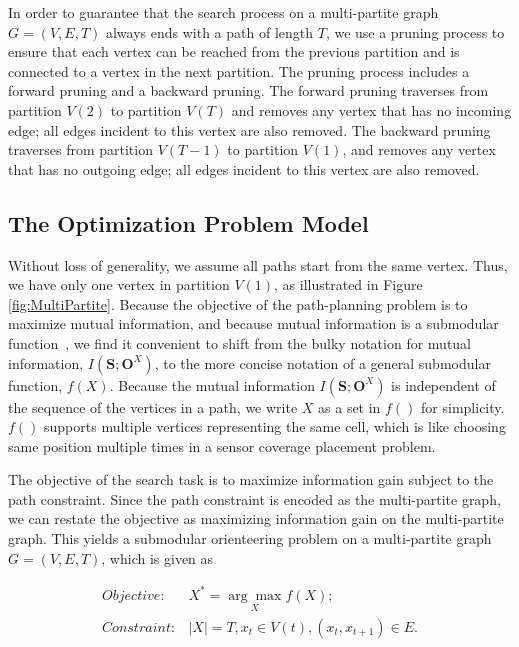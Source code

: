 In order to guarantee that the search process on a multi-partite graph $ G = (V, E, T) $ always ends with a path of length $ T $, we use a pruning process to ensure that each vertex can be reached from the previous partition and is connected to a vertex in the next partition.
The pruning process includes a forward pruning and a backward pruning.
The forward pruning traverses from partition $ V(2) $ to partition $ V(T) $ and removes any vertex that has no incoming edge; all edges incident to this vertex are also removed.
The backward pruning traverses from partition $ V(T-1) $ to partition $ V(1) $, and removes any vertex that has no outgoing edge; all edges incident to this vertex are also removed.

\subsection{The Optimization Problem Model}

Without loss of generality, we assume all paths start from the same vertex.
Thus, we have only one vertex in partition $ V(1) $, as illustrated in Figure \ref{fig:MultiPartite}.
Because the objective of the path-planning problem is to maximize mutual information, and because mutual information is a submodular function~\cite{singh2009efficient}, we find it convenient to shift from the bulky notation for mutual information, $ I(\mathbf{S}; \mathbf{O}^{X} ) $, to the more concise notation of a general submodular function,  $ f(X) $. 
Because the mutual information $ I(\mathbf{S}; \mathbf{O}^{X} ) $ is independent of the sequence of the vertices in a path, we write $ X $ as a set in $ f() $ for simplicity.
$ f() $ supports multiple vertices representing the same cell, which is like choosing same position multiple times in a sensor coverage placement problem. 

The objective of the search task is to maximize information gain subject to the path constraint.  Since the path constraint is encoded as the multi-partite graph, we can restate the objective as maximizing information gain on the multi-partite graph.
This yields a submodular orienteering problem on a multi-partite graph $ G = (V, E, T) $, which is given as

\begin{equation}
\label{eq:gnr_obj}
\begin{aligned}
Objective: & X^{*} = \underset{X}{\arg\max} f(X); \\
Constraint: & |X| = T, x_{t} \in V(t), (x_{t}, x_{t+1}) \in E.
\end{aligned}
\end{equation}

